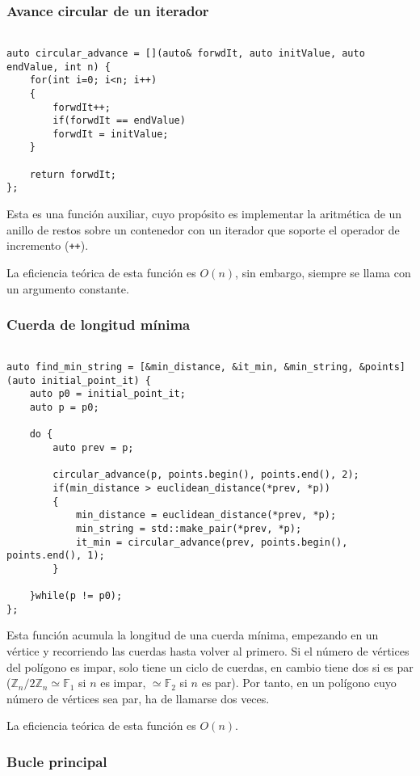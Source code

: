 \documentclass[a4paper, 11pt]{article}
\begin{document}
\subsubsection{Avance circular de un iterador}
\begin{lstlisting}

auto circular_advance = [](auto& forwdIt, auto initValue, auto endValue, int n) {
	for(int i=0; i<n; i++)
	{
		forwdIt++;
		if(forwdIt == endValue)
		forwdIt = initValue;
	}

	return forwdIt;
};
\end{lstlisting}

Esta es una función auxiliar, cuyo propósito es implementar la aritmética de un anillo de restos sobre un contenedor con un iterador que soporte el operador de incremento (\texttt{++}).

La eficiencia teórica de esta función es $O(n)$, sin embargo, siempre se llama con un argumento constante.

\subsubsection{Cuerda de longitud mínima}
\begin{lstlisting}
	
auto find_min_string = [&min_distance, &it_min, &min_string, &points](auto initial_point_it) {
	auto p0 = initial_point_it;
	auto p = p0;
	
	do {
		auto prev = p;
	
		circular_advance(p, points.begin(), points.end(), 2);
		if(min_distance > euclidean_distance(*prev, *p))
		{
			min_distance = euclidean_distance(*prev, *p);
			min_string = std::make_pair(*prev, *p);
			it_min = circular_advance(prev, points.begin(), points.end(), 1);
		}
	
	}while(p != p0);
};
\end{lstlisting}

Esta función acumula la longitud de una cuerda mínima, empezando en un vértice y recorriendo las cuerdas hasta volver al primero. Si el número de vértices del polígono es impar, solo tiene un ciclo de cuerdas, en cambio tiene dos si es par ($\mathbb{Z}_n/2\mathbb{Z}_n \simeq \mathbb{F}_1$ si $n$ es impar, $\simeq \mathbb{F}_2$ si $n$ es par). Por tanto, en un polígono cuyo número de vértices sea par, ha de llamarse dos veces.

La eficiencia teórica de esta función es $O(n)$.
\subsubsection{Bucle principal}
\end{document}
